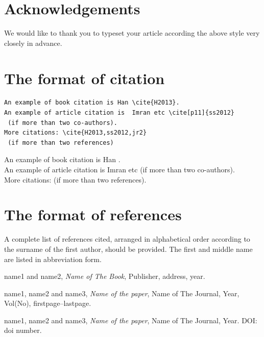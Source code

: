 \documentclass{jaac}
\begin{document}
\section*{Acknowledgements}
We would like to thank you to typeset your article according the above style very closely in
advance.


\section*{The format of citation}
\begin{verbatim}
An example of book citation is Han \cite{H2013}.
An example of article citation is  Imran etc \cite[p11]{ss2012}
 (if more than two co-authors).
More citations: \cite{H2013,ss2012,jr2}
 (if more than two references)
 \end{verbatim}

\vskip 2mm
\vskip 2mm
\noindent An example of book citation is Han \cite{H2013}. \\
An example of article citation is  Imran etc \cite[p11]{ss2012}
 (if more than two co-authors).\\
More citations: \cite{H2013,ss2012,ll2012} (if more than two references).

\section*{The format of references}
A complete list of references cited, arranged in alphabetical order according to the surname of the first
author, should be provided. The first and middle name are listed in abbreviation form.

\vskip 3mm
\vskip 2mm
\noindent name1 and name2,  {\em Name of The Book}, Publisher, address, year.

\vskip 3mm
\vskip 2mm
\noindent name1, name2 and name3, {\em Name of the paper}, Name of The Journal, Year, Vol(No), firstpage--lastpage.\par
\vskip 2mm
\par
\vskip 2mm
\noindent name1, name2 and name3, {\em Name of the paper}, Name of The Journal, Year. DOI: doi number.


%
\end{document}
